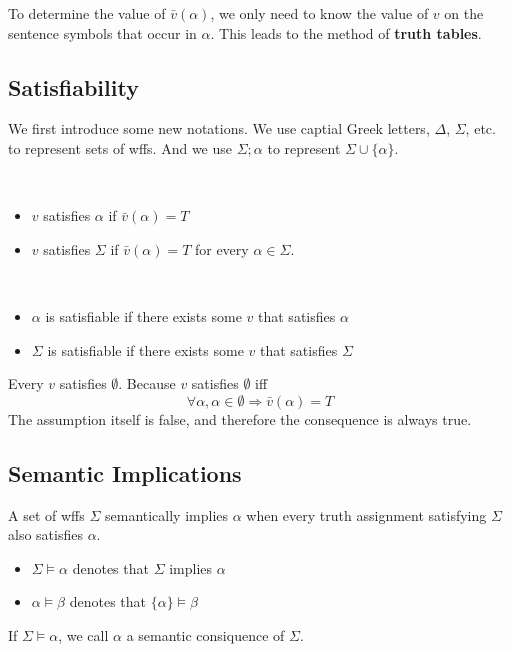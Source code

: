 \begin{remark}
    To determine the value of $\bar{v}(\alpha)$, we only need to know the value of $v$ on the sentence symbols that occur in $\alpha$. This leads to the method of \textbf{truth tables}.
\end{remark}

\subsection{Satisfiability}
\label{sub:Satisfiability}

We first introduce some new notations. We use captial Greek letters, $\Delta$, $\Sigma$, etc. to represent sets of wffs. And we use $\Sigma;\alpha$ to represent $\Sigma \cup \{\alpha\}$.

\begin{definition}~{}
    \begin{itemize}
        \item $v$ satisfies $\alpha$ if $\bar{v}(\alpha) = T$
        \item $v$ satisfies $\Sigma$ if $\bar{v}(\alpha) = T$ for every $\alpha \in \Sigma$.
    \end{itemize}
\end{definition}

\begin{definition}[Satisfiability]~{}
    \label{def:Satisfiability}
    \begin{itemize}
        \item $\alpha$ is satisfiable if there exists some $v$ that satisfies $\alpha$
        \item $\Sigma$ is satisfiable if there exists some $v$ that satisfies $\Sigma$
    \end{itemize}
\end{definition}

\begin{remark}
    Every $v$ satisfies $\emptyset$. Because $v$ satisfies $\emptyset$ iff
    \[ \forall \alpha, \alpha\in\emptyset \Longrightarrow \bar{v}(\alpha) = T \]
    The assumption itself is false, and therefore the consequence is always true.
\end{remark}

\subsection{Semantic Implications}
\label{sub:SemanticImplications}

\begin{definition}
    A set of wffs $\Sigma$ semantically implies $\alpha$ when every truth assignment satisfying $\Sigma$ also satisfies $\alpha$.
    \begin{itemize}
        \item $\Sigma \vDash \alpha$ denotes that $\Sigma$ implies $\alpha$
        \item $\alpha \vDash \beta$ denotes that $\{\alpha\} \vDash \beta$
    \end{itemize}
    If $\Sigma \vDash \alpha$, we call $\alpha$ a semantic consiquence of $\Sigma$.
\end{definition}

